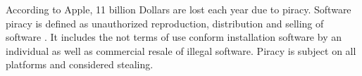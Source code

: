 According to Apple, 11 billion Dollars are lost each year due to piracy.
Software piracy is defined as unauthorized reproduction, distribution and selling of software \cite{applePiracy}.
It includes the not terms of use conform installation software by an individual as well as commercial resale of illegal software.
Piracy is subject on all platforms and considered stealing.
